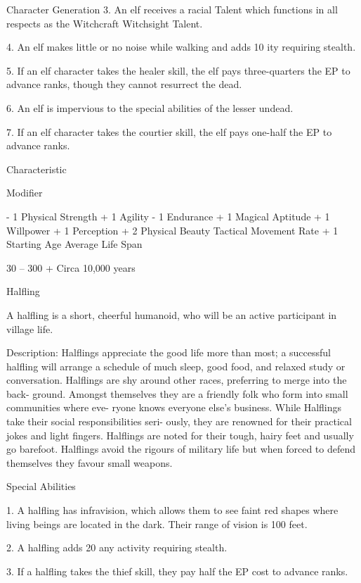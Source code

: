 \begin{Chapter}{Character Generation}
3.  An  elf  receives  a  racial  Talent  which  functions 
in all respects as the Witchcraft Witchsight Talent. 

4.  An  elf  makes  little  or  no  noise  while  walking 
and adds 10%
ity requiring stealth. 

5.  If  an  elf  character  takes  the  healer  skill,  the  elf 
pays  three-quarters  the  EP  to  advance  ranks, 
though they cannot resurrect the dead. 

6.  An  elf  is  impervious  to  the  special  abilities  of 
the lesser undead. 

7. If an elf character takes the courtier skill, the elf 
pays one-half the EP to advance ranks. 

Characteristic 

Modifier 

- 1 
Physical Strength 
+ 1 
Agility 
- 1 
Endurance 
+ 1 
Magical Aptitude 
+ 1 
Willpower 
+ 1 
Perception 
+ 2 
Physical Beauty 
Tactical Movement Rate  + 1 
Starting Age 
Average Life Span 

30 – 300 +  
Circa 10,000 years 

Halfling 

A  halfling  is  a  short,  cheerful  humanoid,  who 
will be an active participant in village life. 

Description:  Halflings  appreciate  the  good  life 
more than most; a successful halfling will arrange a 
schedule  of  much  sleep,  good  food,  and  relaxed 
study  or  conversation.  Halflings  are  shy  around 
other  races,  preferring  to  merge  into  the  back-
ground.  Amongst  themselves  they  are  a  friendly 
folk  who form into small communities  where  eve-
ryone  knows  everyone  else’s  business.  While 
Halflings  take  their  social  responsibilities  seri-
ously,  they  are  renowned  for  their  practical  jokes 
and  light  fingers.  Halflings  are  noted  for  their 
tough, hairy feet and usually go barefoot. Halflings 
avoid the rigours of military life but when forced to 
defend themselves they favour small weapons. 

Special Abilities 

1. A halfling has infravision, which allows them to 
see faint red shapes where living beings are located 
in the dark. Their range of vision is 100 feet. 

2. A halfling adds 20%
any activity requiring stealth. 

3.  If  a  halfling  takes  the  thief  skill,  they  pay  half 
the EP cost to advance ranks. 


\end{Chapter}

